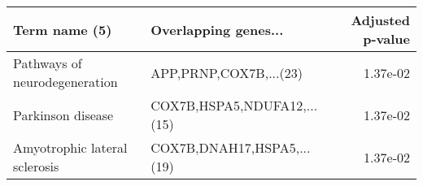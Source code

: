 \begin{tabular}{llr}
\toprule
                Term name (5) &        Overlapping genes... &  Adjusted p-value \\
\midrule
Pathways of neurodegeneration &      APP,PRNP,COX7B,...(23) &          1.37e-02 \\
            Parkinson disease & COX7B,HSPA5,NDUFA12,...(15) &          1.37e-02 \\
Amyotrophic lateral sclerosis &  COX7B,DNAH17,HSPA5,...(19) &          1.37e-02 \\
\bottomrule
\end{tabular}

